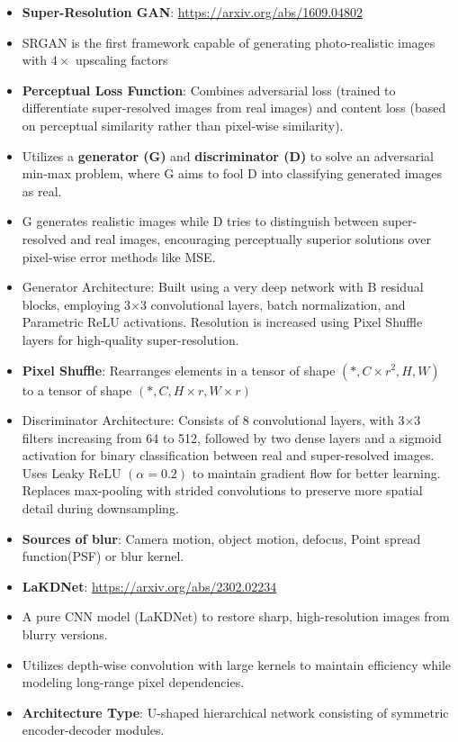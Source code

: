 \documentclass[a4paper]{article}
\begin{document}
\begin{itemize}
    \item \textbf{Super-Resolution GAN}: \url{https://arxiv.org/abs/1609.04802}
    \item SRGAN is the first framework capable of generating photo-realistic images with $4\times$ upscaling factors
    \item \textbf{Perceptual Loss Function}: Combines adversarial loss (trained to differentiate super-resolved images from real images) and content loss (based on perceptual similarity rather than pixel-wise similarity).
    \item Utilizes a \textbf{generator (G)} and \textbf{discriminator (D)} to solve an adversarial min-max problem, where G aims to fool D into classifying generated images as real.
    \item G generates realistic images while D tries to distinguish between super-resolved and real images, encouraging perceptually superior solutions over pixel-wise error methods like MSE.
    \item Generator Architecture: Built using a very deep network with B residual blocks, employing 3×3 convolutional layers, batch normalization, and Parametric ReLU activations. Resolution is increased using Pixel Shuffle layers for high-quality super-resolution.
    \item \textbf{Pixel Shuffle}: Rearranges elements in a tensor of shape $(*,C\times r^2,H,W)$ to a tensor of shape $(*,C,H\times r,W\times r)$
    \item Discriminator Architecture: Consists of 8 convolutional layers, with 3×3 filters increasing from 64 to 512, followed by two dense layers and a sigmoid activation for binary classification between real and super-resolved images. Uses Leaky ReLU $(\alpha = 0.2)$ to maintain gradient flow for better learning. Replaces max-pooling with strided convolutions to preserve more spatial detail during downsampling.
    \item \textbf{Sources of blur}: Camera motion, object motion, defocus, Point spread function(PSF) or blur kernel.
    \item \textbf{LaKDNet}: \url{https://arxiv.org/abs/2302.02234}
    \item A pure CNN model (LaKDNet) to restore sharp, high-resolution images from blurry versions.
    \item Utilizes depth-wise convolution with large kernels to maintain efficiency while modeling long-range pixel dependencies.
    \item \textbf{Architecture Type}: U-shaped hierarchical network consisting of symmetric encoder-decoder modules.

\end{itemize}
\end{document}
